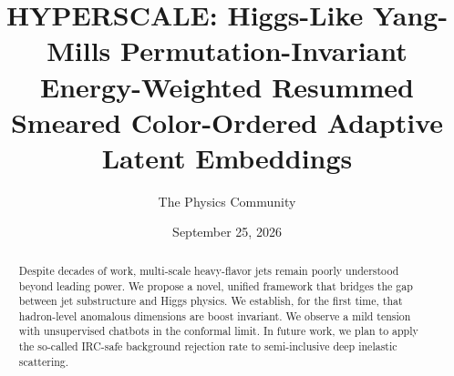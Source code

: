 \documentclass[11pt]{article}
\title{HYPERSCALE: Higgs-Like Yang-Mills Permutation-Invariant Energy-Weighted Resummed Smeared Color-Ordered Adaptive Latent Embeddings}
\author{The Physics Community}
\date{September 25, 2026}
\numberwithin{equation}{section}
\theoremstyle{definition}
\theoremstyle{remark}
\begin{document}
\maketitle
\begin{abstract}
Despite decades of work, multi-scale heavy-flavor jets remain poorly
understood beyond leading power. We propose a novel, unified framework
that bridges the gap between jet substructure and Higgs physics. We
establish, for the first time, that hadron-level anomalous dimensions
are boost invariant. We observe a mild tension with unsupervised
chatbots in the conformal limit. In future work, we plan to apply the
so-called IRC-safe background rejection rate to semi-inclusive deep
inelastic scattering.
\end{abstract}
\tableofcontents




\nocite{*}


\end{document}
